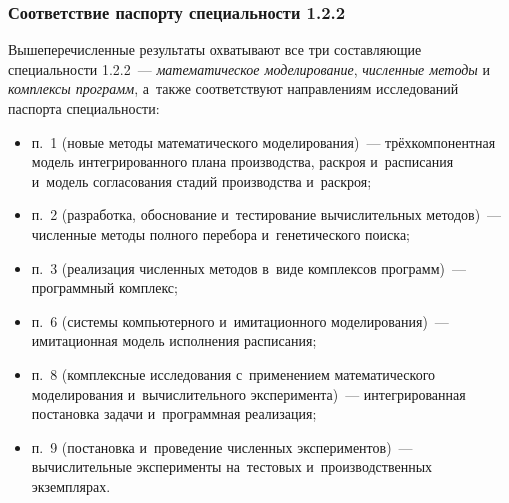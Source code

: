 \begin{frame}[t,allowframebreaks]
    \frametitle{Соответствие паспорту специальности 1.2.2}
    Вышеперечисленные результаты охватывают все три составляющие специальности
    1.2.2~--- \emph{математическое моделирование}, \emph{численные методы} и
    \emph{комплексы программ}, а~также соответствуют направлениям исследований
    паспорта специальности:

    \begin{itemize}
        \item п.~1 (новые методы математического моделирования)~--- трёхкомпонентная модель интегрированного плана производства, раскроя и~расписания и~модель согласования стадий производства и~раскроя;
        \item п.~2 (разработка, обоснование и~тестирование вычислительных методов)~--- численные методы полного перебора и~генетического поиска;
        \item п.~3 (реализация численных методов в~виде комплексов программ)~--- программный комплекс;
        \item п.~6 (системы компьютерного и~имитационного моделирования)~--- имитационная модель исполнения расписания;
        \item п.~8 (комплексные исследования с~применением математического моделирования и~вычислительного эксперимента)~--- интегрированная постановка задачи и~программная реализация;
        \item п.~9 (постановка и~проведение численных экспериментов)~--- вычислительные эксперименты на~тестовых и~производственных экземплярах.
    \end{itemize}
\end{frame}


